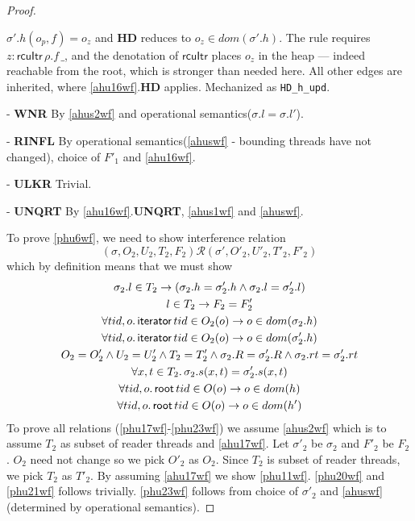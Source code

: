 \begin{proof}
\begin{case}
$\sigma'.h(o_p,f) = o_z$ and \textbf{HD} reduces to $o_z \in dom(\sigma'.h)$.
The rule requires $z:\textsf{rcuItr}\,\rho.f\,\_$, and the denotation of
$\textsf{rcuItr}$ places $o_z$ in the heap --- indeed reachable from the root,
which is stronger than needed here.  All other edges are inherited, where
\ref{ahu16wf}.\textbf{HD} applies.  Mechanized as \texttt{HD\_h\_upd}.
\end{case}
\begin{case} - \textbf{WNR} By \ref{ahus2wf} and operational semantics($\sigma.l = \sigma.l'$).
\end{case}
\begin{case} - \textbf{RINFL} By operational semantics(\ref{ahuswf} - bounding threads have not changed), choice of $F'_1$ and \ref{ahu16wf}. 
\end{case}
\begin{case} - \textbf{ULKR} Trivial. 
\end{case}
\begin{case} - \textbf{UNQRT} By \ref{ahu16wf}.\textbf{UNQRT}, \ref{ahus1wf} and \ref{ahuswf}.
\end{case}

To prove \ref{phu6wf}, we need to show interference relation
\[(\sigma, O_2, U_2, T_2,F_2) \mathcal{R} (\sigma', O'_2, U'_2, T'_2,F'_2)  \]
which by definition means that we must show 
\begin{gather}\label{phu17wf}
  \sigma_2.l  \in  T_2 \rightarrow (\sigma_2.h =\sigma'_2.h \land \sigma_2.l=\sigma'_2.l)\\
  \label{phu18wf}
  l\in T_2\rightarrow F_2=F_2'\\
  \label{phu20wf}
  \forall tid,o\ldotp\textsf{iterator} \, tid \in O_2(o) \rightarrow o \in dom(\sigma_2.h) \\
  \label{phu21wf}
  \forall tid,o\ldotp\textsf{iterator} \, tid \in O_2(o) \rightarrow o \in dom(\sigma'_2.h) \\
  \label{phu22wf}
  O_2 = O_2' \land U_2 = U_2' \land T_2 = T_2'\land \sigma_2.R = \sigma'_2.R \land \sigma_2.rt = \sigma'_2.rt \\
  \label{phu23wf}
  \forall x, t \in T_2 \ldotp \sigma_2.s(x,t) = \sigma'_2.s(x,t)\\
  \label{phuwfrt1}
  \forall tid,o\ldotp\textsf{root} \, tid \in O(o) \rightarrow o \in dom(h) \\
  \label{phuwfrt2}
  \forall tid,o\ldotp\textsf{root} \, tid \in O(o) \rightarrow o \in dom(h') 
\end{gather}
To prove all relations (\ref{phu17wf}-\ref{phu23wf}) we assume \ref{ahus2wf} which is to assume $T_2$ as subset of reader threads and \ref{ahu17wf}. Let $\sigma'_2$ be $\sigma_2$ and $F'_2$ be $F_2$. $O_2$ need not change so we pick $O'_2$  as $O_2$. Since $T_2$ is subset of reader threads, we pick $T_2$ as  $T'_2$. By assuming \ref{ahu17wf}  we show \ref{phu11wf}. \ref{phu20wf} and \ref{phu21wf} follows trivially. \ref{phu23wf} follows from choice of $\sigma'_2$ and \ref{ahuswf}(determined by operational semantics).



\end{proof}
